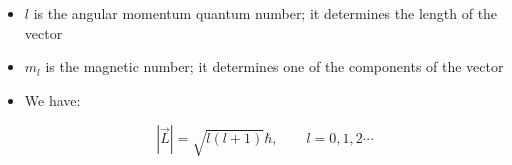\begin{itemize}
\begin{itemize}
\begin{itemize}
          \item $l$ is the angular momentum quantum number; it determines the length of the vector

          \item $m_l$ is the magnetic number; it determines one of the components of the vector

          \item We have:

            $$|\vec{L}|=\sqrt{l(l+1)}\hbar,\quad\quad l=0,1,2\cdots$$

        \end{itemize}

    \end{itemize}

\end{itemize}



